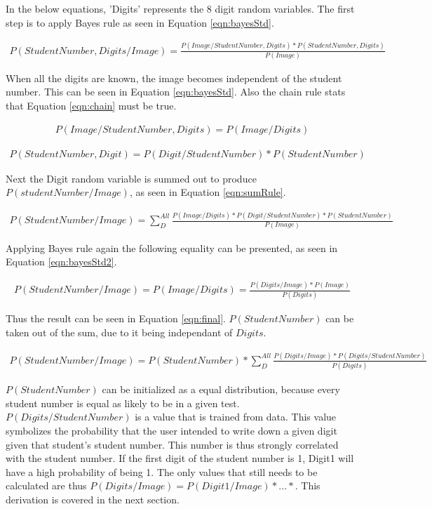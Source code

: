 In the below equations, 'Digits' represents the 8 digit random variables. The first step is to apply Bayes rule as seen in Equation \ref{eqn:bayesStd}.

\begin{align}
  P(StudentNumber,Digits/Image) =  \frac{P(Image/StudentNumber,Digits)*P(StudentNumber,Digits)}{P(Image)}
\label{eqn:bayesStd}
\end{align}

When all the digits are known, the image becomes independent of the student number. This can be seen in Equation \ref{eqn:bayesStd}. Also the chain rule stats that Equation \ref{eqn:chain} must be true.

\begin{align}
  P(Image/StudentNumber,Digits) = P(Image/Digits)
\label{eqn:digitInd}
\end{align}

\begin{align}
  P(StudentNumber,Digit) = P(Digit/StudentNumber)*P(StudentNumber)
\label{eqn:chain}
\end{align}

Next the Digit random variable is summed out to produce $P(studentNumber/Image)$, as seen in Equation \ref{eqn:sumRule}.

\begin{align}
  P(StudentNumber/Image) = \sum_{D}^{All} \frac{P(Image/Digits)*P(Digit/StudentNumber)
  *P(StudentNumber)}{P(Image)}
\label{eqn:sumRule}
\end{align}

Applying Bayes rule again the following equality can be presented, as seen in Equation \ref{eqn:bayesStd2}.

\begin{align}
  P(StudentNumber/Image) = P(Image/Digits) = \frac{P(Digits/Image)*P(Image)}{P(Digits)}
\label{eqn:bayesStd2}
\end{align}

Thus the result can be seen in Equation \ref{eqn:final}. $P(StudentNumber)$ can be taken out of the sum, due to it being independant of $Digits$.

\begin{align}
  P(StudentNumber/Image) = P(StudentNumber)*\sum_{D}^{All} \frac{P(Digits/Image)
  *P(Digits/StudentNumber)}{P(Digits)}
\label{eqn:final}
\end{align}

$P(StudentNumber)$ can be initialized as a equal distribution, because every student number is equal as likely to be in a given test. $P(Digits/StudentNumber)$ is a value that is trained from data. This value symbolizes the probability that the user intended to write down a given digit given that student's student number. This number is thus strongly correlated with the student number. If the first digit of the student number is 1, Digit1 will have a high probability of being 1. The only values that still needs to be calculated are thus $P(Digits/Image) = P(Digit1/Image)*...*$. This derivation is covered in the next section.

